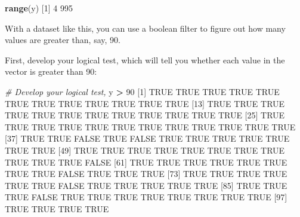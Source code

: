 \documentclass[
]{book}
\newenvironment{Shaded}{\begin{snugshade}}{\end{snugshade}}
\newcommand{\CommentTok}[1]{\textcolor[rgb]{0.56,0.35,0.01}{\textit{#1}}}
\newcommand{\DecValTok}[1]{\textcolor[rgb]{0.00,0.00,0.81}{#1}}
\newcommand{\KeywordTok}[1]{\textcolor[rgb]{0.13,0.29,0.53}{\textbf{#1}}}
\newcommand{\NormalTok}[1]{#1}
\newcommand{\OperatorTok}[1]{\textcolor[rgb]{0.81,0.36,0.00}{\textbf{#1}}}
\newcommand{\OtherTok}[1]{\textcolor[rgb]{0.56,0.35,0.01}{#1}}
\newcommand{\StringTok}[1]{\textcolor[rgb]{0.31,0.60,0.02}{#1}}
\begin{document}
\begin{Shaded}
\begin{Highlighting}[]
\KeywordTok{range}\NormalTok{(y)}
\NormalTok{[}\DecValTok{1}\NormalTok{]   }\DecValTok{4} \DecValTok{995}
\end{Highlighting}
\end{Shaded}

With a dataset like this, you can use a boolean filter to figure out how many values are greater than, say, 90.

First, develop your logical test, which will tell you whether each value in the vector is greater than 90:

\begin{Shaded}
\begin{Highlighting}[]
\CommentTok{# Develop your logical test,}
\NormalTok{y }\OperatorTok{>}\StringTok{ }\DecValTok{90}
\NormalTok{  [}\DecValTok{1}\NormalTok{]  }\OtherTok{TRUE}  \OtherTok{TRUE}  \OtherTok{TRUE}  \OtherTok{TRUE}  \OtherTok{TRUE}  \OtherTok{TRUE}  \OtherTok{TRUE}  \OtherTok{TRUE}  \OtherTok{TRUE}  \OtherTok{TRUE}  \OtherTok{TRUE}  \OtherTok{TRUE}
\NormalTok{ [}\DecValTok{13}\NormalTok{]  }\OtherTok{TRUE}  \OtherTok{TRUE}  \OtherTok{TRUE}  \OtherTok{TRUE}  \OtherTok{TRUE}  \OtherTok{TRUE}  \OtherTok{TRUE}  \OtherTok{TRUE}  \OtherTok{TRUE}  \OtherTok{TRUE}  \OtherTok{TRUE}  \OtherTok{TRUE}
\NormalTok{ [}\DecValTok{25}\NormalTok{]  }\OtherTok{TRUE}  \OtherTok{TRUE}  \OtherTok{TRUE}  \OtherTok{TRUE}  \OtherTok{TRUE}  \OtherTok{TRUE}  \OtherTok{TRUE}  \OtherTok{TRUE}  \OtherTok{TRUE}  \OtherTok{TRUE}  \OtherTok{TRUE}  \OtherTok{TRUE}
\NormalTok{ [}\DecValTok{37}\NormalTok{]  }\OtherTok{TRUE}  \OtherTok{TRUE} \OtherTok{FALSE}  \OtherTok{TRUE} \OtherTok{FALSE}  \OtherTok{TRUE}  \OtherTok{TRUE}  \OtherTok{TRUE}  \OtherTok{TRUE}  \OtherTok{TRUE}  \OtherTok{TRUE}  \OtherTok{TRUE}
\NormalTok{ [}\DecValTok{49}\NormalTok{]  }\OtherTok{TRUE}  \OtherTok{TRUE}  \OtherTok{TRUE}  \OtherTok{TRUE}  \OtherTok{TRUE}  \OtherTok{TRUE}  \OtherTok{TRUE}  \OtherTok{TRUE}  \OtherTok{TRUE}  \OtherTok{TRUE}  \OtherTok{TRUE} \OtherTok{FALSE}
\NormalTok{ [}\DecValTok{61}\NormalTok{]  }\OtherTok{TRUE}  \OtherTok{TRUE}  \OtherTok{TRUE}  \OtherTok{TRUE}  \OtherTok{TRUE}  \OtherTok{TRUE}  \OtherTok{TRUE}  \OtherTok{TRUE} \OtherTok{FALSE}  \OtherTok{TRUE}  \OtherTok{TRUE}  \OtherTok{TRUE}
\NormalTok{ [}\DecValTok{73}\NormalTok{]  }\OtherTok{TRUE}  \OtherTok{TRUE}  \OtherTok{TRUE}  \OtherTok{TRUE}  \OtherTok{TRUE}  \OtherTok{TRUE} \OtherTok{FALSE}  \OtherTok{TRUE}  \OtherTok{TRUE}  \OtherTok{TRUE}  \OtherTok{TRUE}  \OtherTok{TRUE}
\NormalTok{ [}\DecValTok{85}\NormalTok{]  }\OtherTok{TRUE}  \OtherTok{TRUE}  \OtherTok{TRUE} \OtherTok{FALSE}  \OtherTok{TRUE}  \OtherTok{TRUE}  \OtherTok{TRUE}  \OtherTok{TRUE}  \OtherTok{TRUE}  \OtherTok{TRUE}  \OtherTok{TRUE}  \OtherTok{TRUE}
\NormalTok{ [}\DecValTok{97}\NormalTok{]  }\OtherTok{TRUE}  \OtherTok{TRUE}  \OtherTok{TRUE}  \OtherTok{TRUE}
\end{Highlighting}
\end{Shaded}
\end{document}
